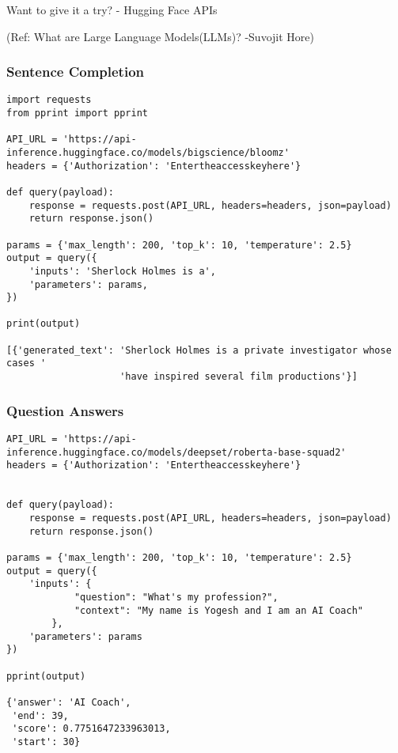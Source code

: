 \begin{frame}[fragile]\frametitle{}
\begin{center}
{\Large Want to give it a try? - Hugging Face APIs}

  {\tiny (Ref: What are Large Language Models(LLMs)? -Suvojit Hore)}

\end{center}
\end{frame}

\begin{frame}[fragile]\frametitle{Sentence Completion}


\begin{lstlisting}
import requests
from pprint import pprint

API_URL = 'https://api-inference.huggingface.co/models/bigscience/bloomz'
headers = {'Authorization': 'Entertheaccesskeyhere'}

def query(payload):
    response = requests.post(API_URL, headers=headers, json=payload)
    return response.json()
  
params = {'max_length': 200, 'top_k': 10, 'temperature': 2.5}
output = query({
    'inputs': 'Sherlock Holmes is a',
    'parameters': params,
})

print(output)

[{'generated_text': 'Sherlock Holmes is a private investigator whose cases '
                    'have inspired several film productions'}]
\end{lstlisting}

\end{frame}


\begin{frame}[fragile]\frametitle{Question Answers}


\begin{lstlisting}
API_URL = 'https://api-inference.huggingface.co/models/deepset/roberta-base-squad2'
headers = {'Authorization': 'Entertheaccesskeyhere'}


def query(payload):
    response = requests.post(API_URL, headers=headers, json=payload)
    return response.json()
  
params = {'max_length': 200, 'top_k': 10, 'temperature': 2.5}
output = query({
    'inputs': {
            "question": "What's my profession?",
            "context": "My name is Yogesh and I am an AI Coach"
        },
    'parameters': params
})

pprint(output)

{'answer': 'AI Coach',
 'end': 39,
 'score': 0.7751647233963013,
 'start': 30}
\end{lstlisting}


\end{frame}


